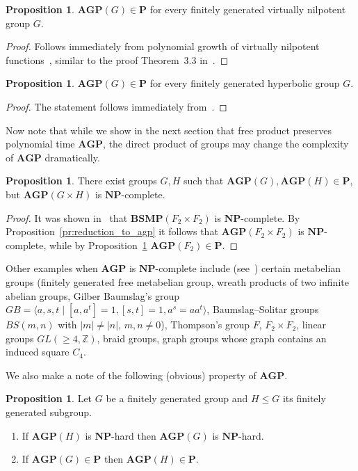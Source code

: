 \documentclass[10pt]{amsart}
\theoremstyle{definition}
\newtheorem{proposition}[theorem]{Proposition}
\def\P{{\mathbf{P}}}
\def\NP{{\mathbf{NP}}}
\def\BSMP{{\mathbf{BSMP}}}
\def\AGP{{\mathbf{AGP}}}
\begin{document}
\begin{proposition}\label{pr:agp_nilp}
$\AGP(G)\in\P$ for every finitely generated virtually nilpotent group $G$.
\end{proposition}
\begin{proof}
Follows immediately from polynomial growth of virtually nilpotent functions~\cite{Wolf}, similar to the proof Theorem~3.3 in~\cite{MNU1}.
\end{proof}

\begin{proposition}\label{pr:agp_hyp}
$\AGP(G)\in\P$ for every finitely generated hyperbolic group $G$.
\end{proposition}
\begin{proof}
The statement follows immediately from~\cite[Proposition 5.5]{MNU1}.
\end{proof}

Now note that while we show in the next section that free product preserves polynomial time $\AGP$, the direct product of groups may change the complexity of $\AGP$ dramatically.
\begin{proposition}
There exist groups $G,H$ such that $\AGP(G),\AGP(H)\in\P$, but $\AGP(G\times H)$ is $\NP$-complete.
\end{proposition}
\begin{proof}
It was shown in~\cite[Theorem 7.4]{MNU1} that $\BSMP(F_2\times F_2)$ is $\NP$-complete. By Proposition~\ref{pr:reduction_to_agp} it follows that $\AGP(F_2\times F_2)$ is $\NP$-complete, while by Proposition~\ref{pr:agp_nilp} $\AGP(F_2)\in\P$.
\end{proof}

Other examples when $\AGP$ is $\NP$-complete include (see~\cite{MNU1}) certain metabelian groups (finitely generated free metabelian group, wreath products of two infinite abelian groups, Gilber Baumslag's group $GB=\langle a,s,t\mid [a,a^t]=1, [s,t]=1, a^s=aa^t\rangle$, Baumslag--Solitar groups $BS(m,n)$ with $|m|\neq |n|$, $m,n\neq 0$), Thompson's group $F$, $F_2\times F_2$, linear groups $GL(\ge4, \mathbb Z)$, braid groups, graph groups whose
graph contains an induced square $C_4$.

We also make a note of the following (obvious) property of $\AGP$.
\begin{proposition}
Let $G$ be a finitely generated group and $H\le G$ its finitely generated subgroup.
\begin{enumerate}
\item If $\AGP(H)$ is $\NP$-hard then $\AGP(G)$ is $\NP$-hard.
\item If $\AGP(G)\in \P$ then $\AGP(H)\in \P$.
\end{enumerate}
\end{proposition}
\end{document}
